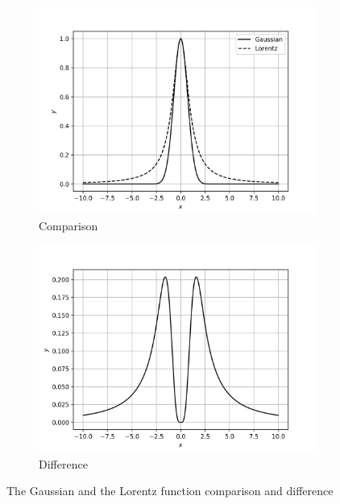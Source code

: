 \documentclass[12]{article}
\begin{document}
\begin{figure}[H]
        \centering
        \begin{subfigure}[t]{0.49\textwidth}
            \centering
            \includegraphics[width=\textwidth]{plots/q3p4.png}
            \caption{Comparison}
            \label{fig:q3p4}
        \end{subfigure}
        \hfill
        \begin{subfigure}[t]{0.49\textwidth}
            \centering
            \includegraphics[width=\textwidth]{plots/q3p5.png}
            \caption{Difference}
            \label{fig:q3p5}
        \end{subfigure}
        \caption{The Gaussian and the Lorentz function comparison and difference}
        \label{fig:q3p45}
    \end{figure}
    
\end{document}
